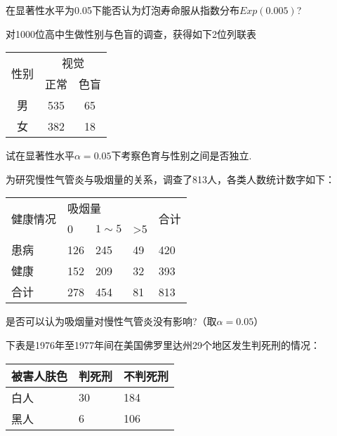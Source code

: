 \begin{xiti}
在显著性水平为0.05下能否认为灯泡寿命服从指数分布$Exp(0.005)$?

\item 对1000位高中生做性别与色盲的调查，获得如下2位列联表
\begin{table}[!htb]
	\centering
	\begin{tabular}{c|cc}\hline
		\multirow{2}[0]{*}{性别} & \multicolumn{2}{c}{视觉} \\
		& 正常    & 色盲 \\\hline
		男     & 535   & 65 \\\hline
		女     & 382   & 18 \\\hline
	\end{tabular}
\end{table}

试在显著性水平$\alpha=0.05$下考察色育与性别之间是否独立.

\item 为研究慢性气管炎与吸烟量的关系，调查了813人，各类人数统计数字如下：
\begin{table}[!htb]
	\centering
	\begin{tabular}{l|llll}
		\toprule
		\multirow{2}{*}{健康情况} & \multicolumn{3}{l}{\hspace{2em}吸烟量} & \multirow{2}{*}{合计} \\
		& 0      & $1\sim 5$    & >5   &                     \\
		\midrule
		患病                    & 126    & 245    & 49    & 420                 \\
		健康                    & 152    & 209    & 32    & 393                 \\
		合计                    & 278    & 454    & 81    & 813                \\
		\bottomrule
	\end{tabular}
\end{table}
是否可以认为吸烟量对慢性气管炎没有影响?（取$\alpha=0.05$）

\item 下表是1976年至1977年间在美国佛罗里达州29个地区发生判死刑的情况：
	\begin{table}[!ht]
	\centering
	\begin{tabularx}{1.0\textwidth}{Z|ZZ}
		\toprule
		被害人肤色&判死刑&不判死刑\\
		\midrule
		白人&30&184\\
		黑人&6&106\\
		\bottomrule
	\end{tabularx}
\end{table}



\end{xiti}
